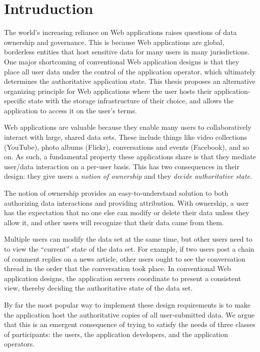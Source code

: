 \section{Intruduction}
\label{sec:introduction}

The world's increasing reliance on Web applications raises questions of data ownership and
governance.  This is because Web applications are global, borderless entities that host
sensitive data for many users in many jurisdictions.  One major shortcoming of conventional
Web application designs is that they place all user data under the control of the
application operator, which ultimately determines the authoritative application
state.  This thesis proposes an alternative 
organizing principle for Web applications where the user hosts their
application-specific state with the storage
infrastructure of their choice, and allows the application to access it on the
user's terms.

Web applications are valuable because they enable many users to collaboratively
interact with large, shared data sets.  These include things like video
collections (YouTube), photo albums (Flickr), conversations and events
(Facebook), and so on.  As such, a fundamental property these applications
share is that they mediate user/data interaction on a
per-user basis.  This has two consequences in their design: they give users a
\textit{notion of ownership} and they \textit{decide authoritative state}.

The notion of ownership provides an easy-to-understand solution to both authorizing data
interactions and providing attribution.  With ownership, a user has the
expectation that no one else can modify or delete their data unless they allow
it, and other users will recognize that their data came from them.

Multiple users can modify the data set at the same time, but other users
need to to view the ``current'' state of the data set.  For example, if two
users post a chain of comment replies on a news article, other users ought to
see the conversation thread in the order that the conversation took place.  In
conventional Web application designs, the application servers coordinate
to present a consistent view, thereby deciding the authoritative state of the
data set.

By far the most popular way to implement these design requirements is to
make the application host the authoritative copies of all user-submitted data.
We argue that this is an emergent consequence of trying to satisfy the needs
of three classes of participants:  the users, the application developers, and
the application operators.

